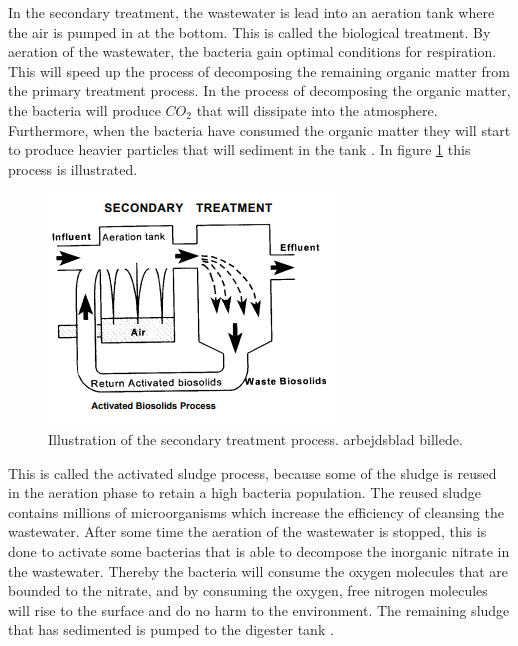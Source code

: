 In the secondary treatment, the wastewater is lead into an aeration tank where the air is pumped in at the bottom. This is called the biological treatment. By aeration of the wastewater, the bacteria gain optimal conditions for respiration. This will speed up the process of decomposing the remaining organic matter from the primary treatment process. In the process of decomposing the organic matter, the bacteria will produce $CO_2$ that will dissipate into the atmosphere. Furthermore, when the bacteria have consumed the organic matter they will start to produce heavier particles that will sediment in the tank \cite{wwtp_ekstra}. In figure \ref{fig:secondary_treatment} this process is illustrated.



\begin{figure}[H]
\centering
\includegraphics[width=.6\textwidth]{report/introduction/pictures/secondary_treatment.png}
\caption{Illustration of the secondary treatment process. arbejdsblad billede. }
\label{fig:secondary_treatment}%
\end{figure} 
This is called the activated sludge process, because some of the sludge is reused in the aeration phase to retain a high bacteria population. %
The reused sludge contains millions of microorganisms which increase the efficiency of cleansing the wastewater. After some time the aeration of the wastewater is stopped, this is done to activate some bacterias that is able to decompose the inorganic nitrate in the wastewater. Thereby the bacteria will consume the oxygen molecules that are bounded to the nitrate, and by consuming the oxygen, free nitrogen molecules will rise to the surface and do no harm to the environment. The remaining sludge that has sedimented is pumped to the digester tank \cite{epa_wwtp}. 

